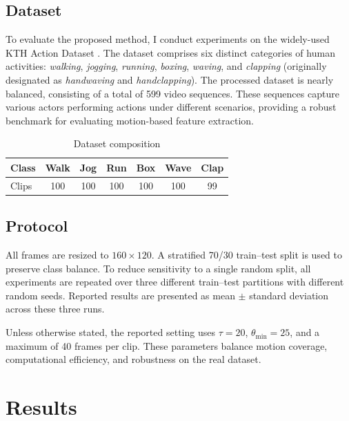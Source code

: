 \documentclass[11pt]{article}
\begin{document}
\subsection{Dataset}

To evaluate the proposed method, I conduct experiments on the widely-used KTH Action Dataset \cite{schuldt2004}. The dataset comprises six distinct categories of human activities: \emph{walking}, \emph{jogging}, \emph{running}, \emph{boxing}, \emph{waving}, and \emph{clapping} (originally designated as \emph{handwaving} and \emph{handclapping}). The processed dataset is nearly balanced, consisting of a total of 599 video sequences. These sequences capture various actors performing actions under different scenarios, providing a robust benchmark for evaluating motion-based feature extraction.

\begin{table}[htbp]
\centering
\small
\setlength{\tabcolsep}{3pt}
\caption{Dataset composition}
\begin{tabular}{lcccccc}
\toprule
Class & Walk & Jog & Run & Box & Wave & Clap \\
\midrule
Clips & 100 & 100 & 100 & 100 & 100 & 99 \\
\bottomrule
\end{tabular}
\end{table}

\subsection{Protocol}

All frames are resized to $160\times120$. A stratified 70/30 train--test split is used to preserve class balance. To reduce sensitivity to a single random split, all experiments are repeated over three different train--test partitions with different random seeds. Reported results are presented as mean $\pm$ standard deviation across these three runs.

Unless otherwise stated, the reported setting uses $\tau=20$, $\theta_{\min}=25$, and a maximum of 40 frames per clip. These parameters balance motion coverage, computational efficiency, and robustness on the real dataset.









\section{Results}
\end{document}
